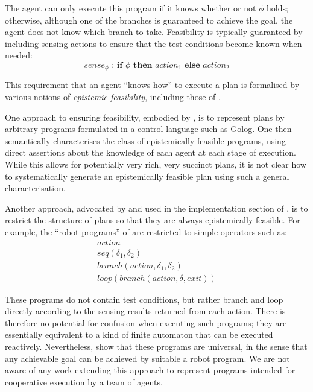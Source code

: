 The agent can only execute this program if it knows whether or not
$\phi$ holds; otherwise, although one of the branches is guaranteed
to achieve the goal, the agent does not know which branch to take.
Feasibility is typically guaranteed by including sensing actions to
ensure that the test conditions become known when needed:\[
sense_{\phi}\,\,;\,\mathbf{if\,}\,\phi\,\,\mathbf{then}\,\, action_{1}\,\,\mathbf{else\,}\, action_{2}\]


This requirement that an agent {}``knows how'' to execute a plan
is formalised by various notions of \emph{epistemic feasibility},
including those of \citep{levesque98what_robots_can_do,levesque00knowing_how,Lesperance01epi_feas_casl,giacomo04sem_delib_indigolog,baier06programs_that_sense}.

One approach to ensuring feasibility, embodied by \citep{levesque00knowing_how,giacomo04sem_delib_indigolog,baier06programs_that_sense},
is to represent plans by arbitrary programs formulated in a control
language such as Golog. One then semantically characterises the class
of epistemically feasible programs, using direct assertions about
the knowledge of each agent at each stage of execution. While this
allows for potentially very rich, very succinct plans, it is not clear
how to systematically generate an epistemically feasible plan using
such a general characterisation.

Another approach, advocated by \citep{levesque96what_is_planning,levesque98what_robots_can_do}
and used in the implementation section of \citep{giacomo04sem_delib_indigolog},
is to restrict the structure of plans so that they are always epistemically
feasible. For example, the {}``robot programs'' of \citep{levesque98what_robots_can_do}
are restricted to simple operators such as:\begin{gather*}
action\\
seq(\delta_{1},\delta_{2})\\
branch(action,\delta_{1},\delta_{2})\\
loop(branch(action,\delta,exit))\end{gather*}


These programs do not contain test conditions, but rather branch and
loop directly according to the sensing results returned from each
action. There is therefore no potential for confusion when executing
such programs; they are essentially equivalent to a kind of finite
automaton that can be executed reactively. Nevertheless, \citet{levesque98what_robots_can_do}
show that these programs are universal, in the sense that any achievable
goal can be achieved by suitable a robot program. We are not aware
of any work extending this approach to represent programs intended
for cooperative execution by a team of agents.

